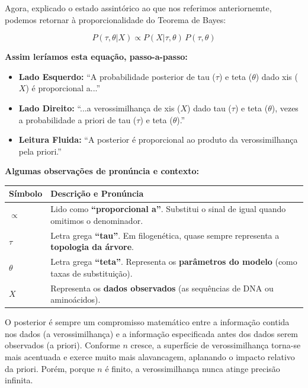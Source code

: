 Agora, explicado o estado assintórico ao que nos referimos anteriornemte, podemos retornar à proporcionalidade do Teorema de Bayes:

$$P(\tau, \theta|X) \propto P(X|\tau, \theta) \, P(\tau, \theta)$$

\textbf{Assim leríamos esta equação, passo-a-passo:}

\begin{itemize}
    \item \textbf{Lado Esquerdo:} ``A probabilidade posterior de tau ($\tau$) e teta ($\theta$) dado xis ($X$) é proporcional a...''
    \item \textbf{Lado Direito:} ``...a verossimilhança de xis ($X$) dado tau ($\tau$) e teta ($\theta$), vezes a probabilidade a priori de tau ($\tau$) e teta ($\theta$).''
    \item \textbf{Leitura Fluida:} ``A posterior é proporcional ao produto da verossimilhança pela priori.''
\end{itemize}

\vspace{0.5cm}

\textbf{Algumas observações de pronúncia e contexto:}

\begin{center}
\renewcommand{\arraystretch}{1.5}
\begin{tabular}{lp{10cm}}
\hline
\textbf{Símbolo} & \textbf{Descrição e Pronúncia} \\ \hline
$\propto$ & Lido como \textbf{``proporcional a''}. Substitui o sinal de igual quando omitimos o denominador. \\
$\tau$ & Letra grega \textbf{``tau''}. Em filogenética, quase sempre representa a \textbf{topologia da árvore}. \\
$\theta$ & Letra grega \textbf{``teta''}. Representa os \textbf{parâmetros do modelo} (como taxas de substituição). \\
$X$ & Representa os \textbf{dados observados} (as sequências de DNA ou aminoácidos). \\ \hline
\end{tabular}
\end{center}

O posterior é sempre um compromisso matemático entre a informação contida nos dados (a verossimilhança) e a informação especificada antes dos dados serem observados (a priori). Conforme $n$ cresce, a superfície de verossimilhança torna-se mais acentuada e exerce muito mais alavancagem, aplanando o impacto relativo da priori. Porém, porque $n$ é finito, a verossimilhança nunca atinge precisão infinita.

